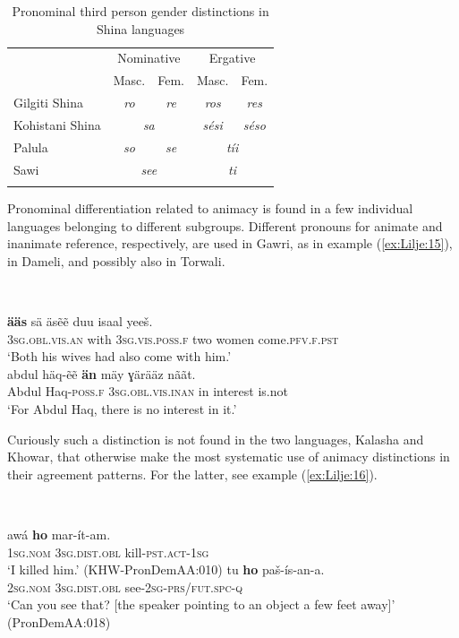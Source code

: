 \documentclass[output=collectionpaper]{langsci/langscibook}
\begin{document}
\begin{table}[htb]
\begin{tabular}{lcccc}
\lsptoprule
& \multicolumn{2}{c}{Nominative} & \multicolumn{2}{c}{Ergative} \\
& Masc. & Fem. & Masc. & Fem.\\
\midrule
Gilgiti Shina & \itshape ro & \itshape re & \itshape ros & \itshape res\\
Kohistani Shina & \multicolumn{2}{c}{\itshape sa} & \itshape sési & \itshape séso\\
Palula & \itshape so & \itshape se & \multicolumn{2}{c}{\itshape tíi}\\
Sawi & \multicolumn{2}{c}{\itshape see} & \multicolumn{2}{c}{\itshape ti}\\
\lspbottomrule
\end{tabular}
\caption{Pronominal third person gender distinctions in Shina languages}
\label{tab:Lilje:11}
\end{table}

Pronominal differentiation related to animacy is found in a few individual languages belonging to different subgroups. Different pronouns for animate and inanimate reference, respectively, are used in Gawri, as in example (\ref{ex:Lilje:15}), in Dameli, and possibly also in Torwali.

\ea
\label{ex:Lilje:15}
\\
\begin{xlist}
\ex
\gll \textbf{ääs} sä äsẽẽ duu isaal yeeš.  \\
\textsc{3sg.obl.vis.an} with \textsc{3sg.vis.poss.f} two women come.\textsc{pfv.f.pst}\\
\glt `Both his wives had also come with him.'\\
\ex
\gll abdul häq{}-ẽẽ \textbf{än} mäy ɣärääz nããt.  \\
Abdul Haq-\textsc{poss.f} \textsc{3sg.obl.vis.inan} in interest is.not  \\
\glt `For Abdul Haq, there is no interest in it.'
\end{xlist}
\z

Curiously such a distinction is not found in the two languages, Kalasha and Khowar, that otherwise make the most systematic use of animacy distinctions in their agreement patterns. For the latter, see example (\ref{ex:Lilje:16}).

\ea
\label{ex:Lilje:16}
\\
\begin{xlist}
\ex
\gll awá  \textbf{ho} mar-ít-am.     \\
\textsc{1sg.nom} \textsc{3sg.dist.obl} kill-\textsc{pst.act-1sg}     \\
\glt `I killed him.' (KHW-PronDemAA:010)
\ex
\gll tu \textbf{ho} paš-ís-an-a.    \\
\textsc{2sg.nom} \textsc{3sg.dist.obl} see-\textsc{2sg-prs/fut.spc-q}    \\
\glt `Can you see that? [the speaker pointing to an object a few feet away]' (PronDemAA:018)
\end{xlist}
\z
\end{document}
